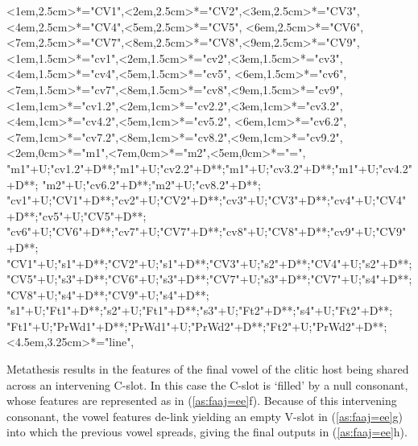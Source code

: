 \begin{multicols}{2}
\begin{exe}
{\begin{xlist}
{		<1em,2.5cm>*="CV1",<2em,2.5cm>*="CV2",<3em,2.5cm>*="CV3",<4em,2.5cm>*="CV4",<5em,2.5cm>*="CV5",
		<6em,2.5cm>*="CV6",<7em,2.5cm>*="CV7",<8em,2.5cm>*="CV8",<9em,2.5cm>*="CV9",
		<1em,1.5cm>*="cv1",<2em,1.5cm>*="cv2",<3em,1.5cm>*="cv3",<4em,1.5cm>*\as{ }="cv4",<5em,1.5cm>*\as{\j}="cv5",
		<6em,1.5cm>*="cv6",<7em,1.5cm>*\as{ }="cv7",<8em,1.5cm>*="cv8",<9em,1.5cm>*\as{ }="cv9",
		<1em,1cm>*="cv1.2",<2em,1cm>*="cv2.2",<3em,1cm>*="cv3.2",<4em,1cm>*\as{ }="cv4.2",<5em,1cm>*\as{\j}="cv5.2",
		<6em,1cm>*="cv6.2",<7em,1cm>*\as{ }="cv7.2",<8em,1cm>*="cv8.2",<9em,1cm>*\as{ }="cv9.2",
		<2em,0cm>*="m1",<7em,0cm>*="m2",<5em,0cm>*\as{=}="=",
		"m1"+U;"cv1.2"+D**\dir{-};"m1"+U;"cv2.2"+D**\dir{-};"m1"+U;"cv3.2"+D**\dir{-};"m1"+U;"cv4.2"+D**\dir{};
		"m2"+U;"cv6.2"+D**\dir{-};"m2"+U;"cv8.2"+D**\dir{-};
		"cv1"+U;"CV1"+D**\dir{-};"cv2"+U;"CV2"+D**\dir{-};"cv3"+U;"CV3"+D**\dir{-};"cv4"+U;"CV4"+D**\dir{};"cv5"+U;"CV5"+D**\dir{-};
		"cv6"+U;"CV6"+D**\dir{-};"cv7"+U;"CV7"+D**\dir{};"cv8"+U;"CV8"+D**\dir{-};"cv9"+U;"CV9"+D**\dir{};
		"CV1"+U;"s1"+D**\dir{-};"CV2"+U;"s1"+D**\dir{-};"CV3"+U;"s2"+D**\dir{-};"CV4"+U;"s2"+D**\dir{-};
		"CV5"+U;"s3"+D**\dir{-};"CV6"+U;"s3"+D**\dir{-};"CV7"+U;"s3"+D**\dir{-};"CV7"+U;"s4"+D**\dir{-};"CV8"+U;"s4"+D**\dir{-};"CV9"+U;"s4"+D**\dir{-};
		"s1"+U;"Ft1"+D**\dir{-};"s2"+U;"Ft1"+D**\dir{-};"s3"+U;"Ft2"+D**\dir{-};"s4"+U;"Ft2"+D**\dir{-};
		"Ft1"+U;"PrWd1"+D**\dir{-};"PrWd1"+U;"PrWd2"+D**\dir{-};"Ft2"+U;"PrWd2"+D**\dir{-};
		<4.5em,3.25cm>*="line",
	\endxy}
	\end{xlist}}
\end{exe}
\end{multicols}

Metathesis results in the features of the final vowel of the clitic host
being shared across an intervening C-slot.
In this case the C-slot is `filled' by a null consonant,
whose features are represented as \tsc{[-c.]} in (\ref{as:faaj=ee}f).
Because of this intervening consonant, the vowel features de-link
yielding an empty V-slot in (\ref{as:faaj=ee}g)
into which the previous vowel spreads,
giving the final outputs in (\ref{as:faaj=ee}h).

